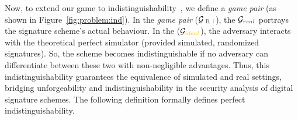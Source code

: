 Now, to extend our game to indistinguishability~\cite{ssprove,joy,companion}, 
we define a \emph{game pair} (as shown in Figure~\ref{fig:problem:ind}).
%
In the \emph{game pair} ($ \mathcal{G}_{\text{ \textcolor{lGray}{R} \textcolor{lYellow}{I}} }$), 
the $\mathcal{G}_{\real}$ portrays the signature scheme's actual behaviour.
%
In the ($\mathcal{G}_{\ideal}$), 
the adversary interacts with the theoretical perfect simulator (provided simulated, randomized signatures). 
%
So, the scheme becomes indistinguishable if no adversary can differentiate between these two with non-negligible advantages. 
%
Thus, this indistinguishability guarantees the equivalence of simulated and real settings, bridging unforgeability and 
indistinguishability in the security analysis of digital signature schemes. 
%
The following definition formally defines perfect indistinguishability.
%

